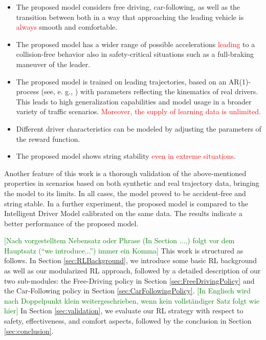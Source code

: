 \documentclass[review]{elsarticle}
\providecommand{\red}[1]{\textcolor{red}{#1}}
\providecommand{\green}[1]{\textcolor{green}{#1}}
\providecommand{\martin}[1]{\red{#1}} %
\providecommand{\martinc}[1]{\green{[#1]}} %
\providecommand{\3}{{\ss}}
\begin{document}
\begin{itemize}
	\item  The proposed model considers free driving,
          car-following, as well as the transition between both in a
          way that approaching the leading vehicle is \martin{always} smooth and comfortable.
	\item The proposed model has a wider range of possible
          accelerations \martin{leading} to a collision-free behavior
          also in safety-critical situations such as a full-braking maneuver of the leader.
	\item The proposed model is trained on leading trajectories,
          based on an AR(1)-process (see, e. g., \cite{HonerkampEngl})
          with parameters reflecting the kinematics of real
          drivers. This leads to high generalization capabilities and
          model usage in a broader variety of traffic
          scenarios. \martin{Moreover, the supply of learning data is
            unlimited.} 
	\item Different driver characteristics can be modeled by adjusting the parameters of the reward function.
	\item The proposed model shows string stability \martin{even in
          extreme situations}.
	
\end{itemize}

Another feature of this work is a thorough validation of the above-mentioned properties in scenarios based on both synthetic and real trajectory data, bringing the model to its limits. 
In all cases, the model proved to be accident-free and string stable.
In a further experiment, the proposed model is compared to the Intelligent Driver Model calibrated on the same data. The results indicate a better performance of the proposed model.

\martinc{Nach vorgestelltem Nebensatz oder Phrase (In Section ...,) folgt vor dem
  Hauptsatz (``we introduce...'') immer ein Komma}
This work is structured as follows. In Section \ref{sec:RLBackground},
we introduce some basic RL background as well as our modularized RL
approach, followed by a detailed description of our two sub-modules:
the Free-Driving policy in Section \ref{sec:FreeDrivingPolicy} and the
Car-Following policy in Section
\ref{sec:CarFollowingPolicy}. \martinc{In Englisch wird nach
  Doppelpunkt klein weitergeschrieben, wenn kein vollst\"andiger Satz
  folgt wie hier} In Section \ref{sec:validation}, we evaluate our RL strategy with respect to safety, effectiveness, and comfort aspects, followed by the conclusion in Section \ref{sec:conclusion}.
\end{document}
